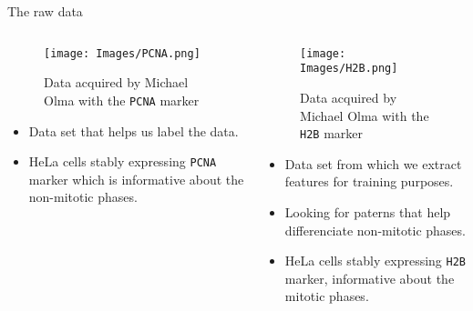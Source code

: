 \documentclass{beamer}
\begin{document}
\begin{frame}{The raw data}
\begin{columns}[T] %
\begin{column}{.40\textwidth}
\begin{footnotesize}
\begin{figure}[!ht]
\centering
\texttt{[image: Images/PCNA.png]}
\caption{Data acquired by Michael Olma with the \texttt{PCNA} marker}
\label{PCNA_michael_olma}
\end{figure}


\begin{itemize}
\item Data set that helps us label the data.
\item HeLa cells stably expressing \texttt{PCNA} marker which is informative about the non-mitotic phases.
\end{itemize}
\end{footnotesize}

\end{column}%

\hfill%

\begin{column}{.56\textwidth}
\begin{footnotesize}
\begin{figure}[!ht]
\centering
\texttt{[image: Images/H2B.png]}
\caption{Data acquired by Michael Olma with the \texttt{H2B} marker}
\label{H2B}
\end{figure}


\begin{itemize}
\item Data set from which we extract features for training purposes. 
\item Looking for paterns that help differenciate non-mitotic phases.
\item HeLa cells stably expressing \texttt{H2B} marker, informative about the mitotic phases.
\end{itemize}
\end{footnotesize}

\end{column}%

\end{columns}


\end{frame}

\iffalse
\end{document}

